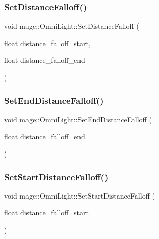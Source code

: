 \hypertarget{classmage_1_1_omni_light_af42a66c4ded3ec270c05f2114c2565fa}{}\label{classmage_1_1_omni_light_af42a66c4ded3ec270c05f2114c2565fa} 
\subsubsection{\texorpdfstring{Set\+Distance\+Falloff()}{SetDistanceFalloff()}}
{\footnotesize\ttfamily void mage\+::\+Omni\+Light\+::\+Set\+Distance\+Falloff (\begin{DoxyParamCaption}\item[{float}]{distance\+\_\+falloff\+\_\+start,  }\item[{float}]{distance\+\_\+falloff\+\_\+end }\end{DoxyParamCaption})}

\hypertarget{classmage_1_1_omni_light_a620747a69ab6cc7b3801da76b6d2bef4}{}\label{classmage_1_1_omni_light_a620747a69ab6cc7b3801da76b6d2bef4} 
\subsubsection{\texorpdfstring{Set\+End\+Distance\+Falloff()}{SetEndDistanceFalloff()}}
{\footnotesize\ttfamily void mage\+::\+Omni\+Light\+::\+Set\+End\+Distance\+Falloff (\begin{DoxyParamCaption}\item[{float}]{distance\+\_\+falloff\+\_\+end }\end{DoxyParamCaption})}

\hypertarget{classmage_1_1_omni_light_a1aa0708286f33343f1d0c86ff5929c05}{}\label{classmage_1_1_omni_light_a1aa0708286f33343f1d0c86ff5929c05} 
\subsubsection{\texorpdfstring{Set\+Start\+Distance\+Falloff()}{SetStartDistanceFalloff()}}
{\footnotesize\ttfamily void mage\+::\+Omni\+Light\+::\+Set\+Start\+Distance\+Falloff (\begin{DoxyParamCaption}\item[{float}]{distance\+\_\+falloff\+\_\+start }\end{DoxyParamCaption})}




